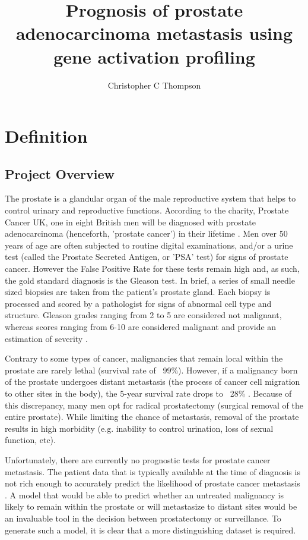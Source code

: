 \documentclass[final]{article}
\title{Prognosis of prostate adenocarcinoma metastasis using gene activation profiling}
\author{Christopher C Thompson}
\begin{document}
\maketitle

\section{Definition}

\subsection{Project Overview}

The prostate is a glandular organ of the male reproductive system that helps to
control urinary and reproductive functions.  According to the charity, Prostate
Cancer UK, one in eight British men will  be diagnosed with prostate
adenocarcinoma (henceforth, 'prostate cancer') in their  lifetime \cite{PCUK}.
Men over 50 years of age are often subjected to routine digital examinations,
and/or a urine test (called the Prostate Secreted Antigen, or 'PSA' test) for
signs of prostate cancer.  However the False Positive Rate for these tests remain high \cite{Brawley16} and,
as such,  the gold standard diagnosis is the Gleason test.  In brief, a series
of small needle sized biopsies are taken from the patient's prostate gland.
Each biopsy is processed and scored by a pathologist for signs of abnormal cell
type and structure.  Gleason grades ranging from 2 to 5 are considered not
malignant, whereas scores ranging from 6-10 are considered malignant and provide
an estimation of severity \cite{Humphrey04}.

Contrary to some types of cancer, malignancies that remain local within the
prostate are rarely lethal (survival rate of ~99\%).  However, if a malignancy
born of the prostate undergoes distant metastasis (the process of cancer cell
migration to other sites in the body), the 5-year survival rate drops to ~28\% \cite{CancerOrg}.
Because of this discrepancy, many men opt for radical prostatectomy (surgical
removal of the entire prostate).  While limiting the chance of metastasis,
removal of the prostate results in high morbidity (e.g. inability to control
urination, loss of sexual function, etc).

Unfortunately, there are currently no prognostic tests for prostate cancer metastasis.  The
patient data  that is typically available at the time of diagnosis is not rich
enough to accurately predict the likelihood of prostate cancer metastasis \cite{Brawley16}.   A
model that would be able to predict whether an untreated malignancy is likely to
remain within the prostate or will metastasize to distant sites would be an invaluable tool
in the decision between prostatectomy or surveillance.  To
generate such a model, it is clear that a more distinguishing dataset is required.
\end{document}
